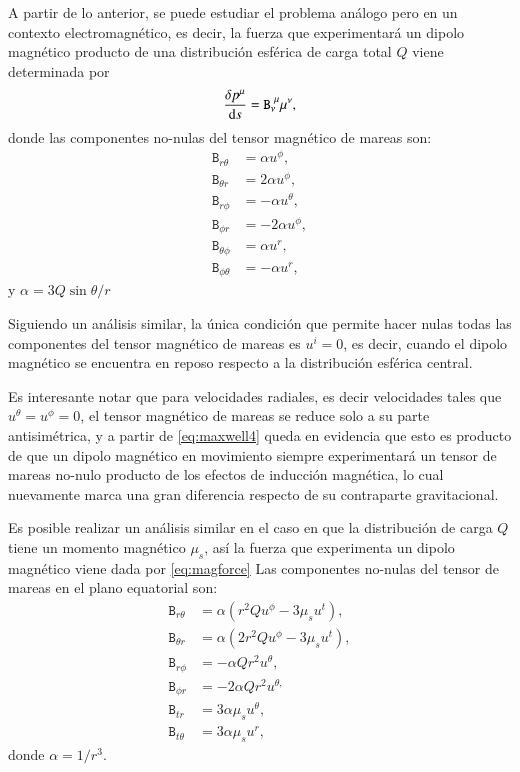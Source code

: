A partir de lo anterior, se puede estudiar el problema análogo pero en un contexto electromagnético, es decir, la fuerza que experimentará un dipolo magnético producto de una distribución esférica de carga total $Q$ viene determinada por
\begin{equation}
\label{eq:magforce}
\frac{\delta p^{\mu}}{\mathrm{d}s} = \mathtt{B}^{\ \mu}_{\nu} \mu^{\nu},
\end{equation}
donde las componentes no-nulas del tensor magnético de mareas son:
\begin{align}
\mathtt{B}_{r \theta} &= \alpha u^{\phi},\\
\mathtt{B}_{\theta r} &= 2\alpha u^{\phi},\\
\mathtt{B}_{r \phi} &= -\alpha u^{\theta},\\
\mathtt{B}_{\phi r} &= -2\alpha u^{\phi},\\
\mathtt{B}_{\theta \phi} &= \alpha u^{r},\\
\mathtt{B}_{\phi \theta} &= -\alpha u^{r},
\end{align}
y $\alpha=3Q \sin \theta /r$

Siguiendo un análisis similar, la única condición que permite hacer nulas todas las componentes del tensor magnético de mareas es $u^i=0$, es decir, cuando el dipolo magnético se encuentra en reposo respecto a la distribución esférica central.

Es interesante notar que para velocidades radiales, es decir velocidades tales que $u^{\theta} = u^{\phi} = 0$, el tensor magnético de mareas se reduce solo a su parte antisimétrica, y a partir de \eqref{eq:maxwell4} queda en evidencia que esto es producto de que un dipolo magnético en movimiento siempre experimentará un tensor de mareas no-nulo producto de los efectos de inducción magnética, lo cual nuevamente marca una gran diferencia respecto de su contraparte gravitacional.

Es posible realizar un análisis similar en el caso en que la distribución de carga $Q$ tiene un momento magnético $\mu_s$, así la fuerza que experimenta un dipolo magnético viene dada por \eqref{eq:magforce} Las componentes no-nulas del tensor de mareas en el plano equatorial son:
\begin{align}
\mathtt{B}_{r \theta} &= \alpha \left( r^2 Q u^{\phi} - 3\mu_s u^t \right),\\
\mathtt{B}_{\theta r} &= \alpha \left( 2r^2 Q u^{\phi} - 3\mu_s u^t \right),\\
\mathtt{B}_{r \phi} &= -\alpha Q r^2 u^{\theta},\\
\mathtt{B}_{\phi r} &= -2\alpha Q r^2 u^{\theta,}\\
\mathtt{B}_{t r} &= 3 \alpha \mu_s u^{\theta},\\
\mathtt{B}_{t \theta} &= 3 \alpha \mu_s u^{r},
\end{align}
donde $\alpha = 1/r^3$.

